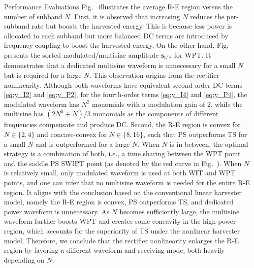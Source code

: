 \documentclass[journal]{IEEEtran}
\begin{document}
\begin{section}{Performance Evaluations}
		Fig.~ illustrates the average R-E region versus the number of subband $N$. First, it is observed that increasing $N$ reduces the per-subband rate but boosts the harvested energy. This is because less power is allocated to each subband but more balanced DC terms are introduced by frequency coupling to boost the harvested energy. On the other hand, Fig.~ presents the sorted modulated/multisine amplitude $\boldsymbol{s}_{\mathrm{I/P}}$ for WPT. It demonstrates that a dedicated multisine waveform is unnecessary for a small $N$ but is required for a large $N$. This observation origins from the rectifier nonlinearity. Although both waveforms have equivalent second-order DC terms \eqref{eq:y_I2} and \eqref{eq:y_P2}, for the fourth-order terms \eqref{eq:y_I4} and \eqref{eq:y_P4}, the modulated waveform has $N^2$ monomials with a modulation gain of \num{2}, while the multisine has $(2N^3+N)/3$ monomials as the components of different frequencies compensate and produce DC. Second, the R-E region is convex for $N \in \{2,4\}$ and concave-convex for $N \in \{8,16\}$, such that PS outperforms TS for a small $N$ and is outperformed for a large $N$. When $N$ is in between, the optimal strategy is a combination of both, i.e., a time sharing between the WPT point and the saddle PS SWIPT point (as denoted by the red curve in Fig.~). When $N$ is relatively small, only modulated waveform is used at both WIT and WPT points, and one can infer that no multisine waveform is needed for the entire R-E region. It aligns with the conclusion based on the conventional linear harvester model, namely the R-E region is convex, PS outperforms TS, and dedicated power waveform is unnecessary. As $N$ becomes sufficiently large, the multisine waveform further boosts WPT and creates some concavity in the high-power region, which accounts for the superiority of TS under the nonlinear harvester model. Therefore, we conclude that the rectifier nonlinearity enlarges the R-E region by favoring a different waveform and receiving mode, both heavily depending on $N$.


\end{section}
\end{document}
